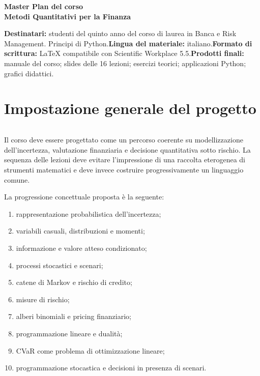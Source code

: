 \documentclass[12pt,a4paper]{article}%
\begin{document}
\tableofcontents

\begin{center}
{\Large \textbf{Master Plan del corso}}\\[6pt]{\large \textbf{Metodi
Quantitativi per la Finanza}}\\[12pt]
\end{center}

\textbf{Destinatari:} studenti del quinto anno del corso di laurea in Banca e
Risk Management. Principi di Python.\newline\textbf{Lingua del materiale:}
italiano.\newline\textbf{Formato di scrittura:} LaTeX compatibile con
Scientific Workplace 5.5.\newline\textbf{Prodotti finali:} manuale del corso;
slides delle 16 lezioni; esercizi teorici; applicazioni Python; grafici didattici.

\newpage

\section{Impostazione generale del progetto}

\inputminted{python}{Pippo.py}

Il corso deve essere progettato come un percorso coerente su modellizzazione
dell'incertezza, valutazione finanziaria e decisione quantitativa sotto
rischio. La sequenza delle lezioni deve evitare l'impressione di una raccolta
eterogenea di strumenti matematici e deve invece costruire progressivamente un
linguaggio comune.

La progressione concettuale proposta \`{e} la seguente:

\begin{enumerate}
\item rappresentazione probabilistica dell'incertezza;

\item variabili casuali, distribuzioni e momenti;

\item informazione e valore atteso condizionato;

\item processi stocastici e scenari;

\item catene di Markov e rischio di credito;

\item misure di rischio;

\item alberi binomiali e pricing finanziario;

\item programmazione lineare e dualit\`{a};

\item CVaR come problema di ottimizzazione lineare;

\item programmazione stocastica e decisioni in presenza di scenari.
\end{enumerate}
\end{document}
